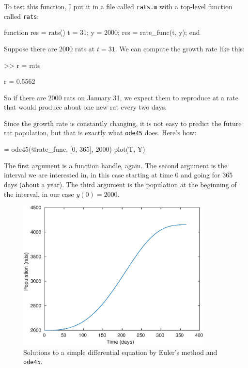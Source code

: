 \documentclass[
]{book}
\numberwithin{Answer}{chapter}
\numberwithin{Exercise}{chapter}
\begin{document}
To test this function, I put it in a file called {\tt rats.m} with a top-level function called {\tt rats}:

\begin{code}
function res = rats()
    t = 31;
    y = 2000;
    res = rate_func(t, y);
end
\end{code}

Suppose there are 2000 rats at $t=31$.  We can compute the growth rate like this:

\begin{code}
>> r = rats

r = 0.5562
\end{code}

So if there are 2000 rats on January 31, we expect them to 
reproduce at a rate that would produce about one new rat every two days. 

Since the growth rate is constantly changing, it is not easy to predict
the future rat population, but that is exactly what {\tt ode45} does.
Here's how:

\begin{code}
[T, Y] = ode45(@rate_func, [0, 365], 2000)
plot(T, Y)
\end{code}

The first argument is a function handle, again.  The second argument is the interval we are interested
in, in this case starting at time 0 and going for 365 days (about a year).  
The third argument is the population at the beginning of the interval, 
in our case $y(0) = 2000$.

\begin{figure}
\centerline{\includegraphics[height=3in]{figs/rats.eps}}
\caption{Solutions to a simple differential equation by Euler's method and {\tt ode45}.}
\label{fig:rats}
\end{figure}
\end{document}
